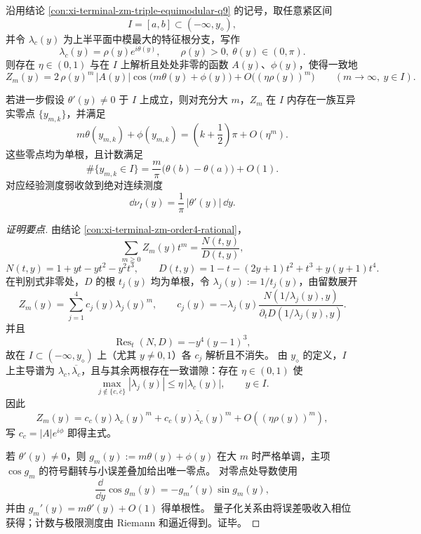 \begin{conclusion}[振荡主导区间上的实零点量子化律与指数误差]\label{con:xi-terminal-zm-leyang-real-zero-quantization}
沿用结论 \ref{con:xi-terminal-zm-triple-equimodular-q9} 的记号，取任意紧区间
\[
I=[a,b]\subset(-\infty,y_\diamond),
\]
并令 \(\lambda_c(y)\) 为上半平面中模最大的特征根分支，写作
\[
\lambda_c(y)=\rho(y)e^{i\theta(y)},\qquad \rho(y)>0,\ \theta(y)\in(0,\pi).
\]
则存在 \(\eta\in(0,1)\) 与在 \(I\) 上解析且处处非零的函数 \(A(y)\)、\(\phi(y)\)，使得一致地
\[
Z_m(y)
=
2\,\rho(y)^m\,|A(y)|\cos\!\bigl(m\theta(y)+\phi(y)\bigr)
+ O\!\bigl((\eta\rho(y))^m\bigr)
\qquad (m\to\infty,\ y\in I).
\]

若进一步假设 \(\theta'(y)\neq 0\) 于 \(I\) 上成立，则对充分大 \(m\)，\(Z_m\) 在 \(I\) 内存在一族互异实零点 \(\{y_{m,k}\}\)，并满足
\[
m\theta(y_{m,k})+\phi(y_{m,k})
=
\left(k+\frac12\right)\pi + O(\eta^m).
\]
这些零点均为单根，且计数满足
\[
\#\{y_{m,k}\in I\}
=
\frac{m}{\pi}\bigl(\theta(b)-\theta(a)\bigr)+O(1).
\]
对应经验测度弱收敛到绝对连续测度
\[
\dd \nu_I(y)=\frac{1}{\pi}\,|\theta'(y)|\,\dd y.
\]
\end{conclusion}
\begin{proof}[证明要点]
由结论 \ref{con:xi-terminal-zm-order4-rational}，
\[
\sum_{m\ge 0}Z_m(y)t^m=\frac{N(t,y)}{D(t,y)},
\]
\[
N(t,y)=1+yt-yt^2-y^2t^3,\qquad
D(t,y)=1-t-(2y+1)t^2+t^3+y(y+1)t^4.
\]
在判别式非零处，\(D\) 的根 \(t_j(y)\) 均为单根，令 \(\lambda_j(y):=1/t_j(y)\)，由留数展开
\[
Z_m(y)=\sum_{j=1}^4 c_j(y)\lambda_j(y)^m,\qquad
c_j(y)=-\lambda_j(y)\frac{N(1/\lambda_j(y),y)}{\partial_t D(1/\lambda_j(y),y)}.
\]
并且
\[
\operatorname{Res}_{t}(N,D)=-y^4(y-1)^3,
\]
故在 \(I\subset(-\infty,y_\diamond)\) 上（尤其 \(y\neq 0,1\)）各 \(c_j\) 解析且不消失。
由 \(y_\diamond\) 的定义，\(I\) 上主导谱为 \(\lambda_c,\overline{\lambda_c}\)，且与其余两根存在一致谱隙：存在 \(\eta\in(0,1)\) 使
\[
\max_{j\notin\{c,\overline c\}}|\lambda_j(y)|\le \eta\,|\lambda_c(y)|,\qquad y\in I.
\]
因此
\[
Z_m(y)=c_c(y)\lambda_c(y)^m+\overline{c_c(y)\lambda_c(y)^m}+O((\eta\rho(y))^m),
\]
写 \(c_c=|A|e^{i\phi}\) 即得主式。

若 \(\theta'(y)\neq 0\)，则
\(
g_m(y):=m\theta(y)+\phi(y)
\)
在大 \(m\) 时严格单调，主项 \(\cos g_m\) 的符号翻转与小误差叠加给出唯一零点。
对零点处导数使用
\[
\frac{\dd}{\dd y}\cos g_m(y)=-g_m'(y)\sin g_m(y),
\]
并由 \(g_m'(y)=m\theta'(y)+O(1)\) 得单根性。
量子化关系由将误差吸收入相位获得；计数与极限测度由 Riemann 和逼近得到。证毕。
\end{proof}

